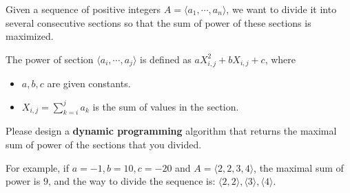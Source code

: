 
Given a sequence of positive integers $A=\langle a_1,\cdots,a_n\rangle$, we want to divide it into several consecutive sections so that the sum of power of these sections 
is maximized.

The power of section $\langle a_i,\cdots,a_j\rangle$ is defined as $aX_{i,j}^2+bX_{i,j}+c$, where
\begin{itemize}
    \item $a,b,c$ are given constants.
    \item $X_{i,j}=\sum\limits_{k=i}^j a_k$ is the sum of values in the section.
\end{itemize}

Please design a \textbf{dynamic programming} algorithm that returns the maximal sum of power of the sections that you divided.

For example, if \(a=-1,b=10,c=-20\) and \(A=\langle 2,2,3,4\rangle\), the maximal sum of power is \(9\), and the way to divide the sequence is: \(\langle 2,2\rangle,\langle 3\rangle,\langle 4\rangle\).

